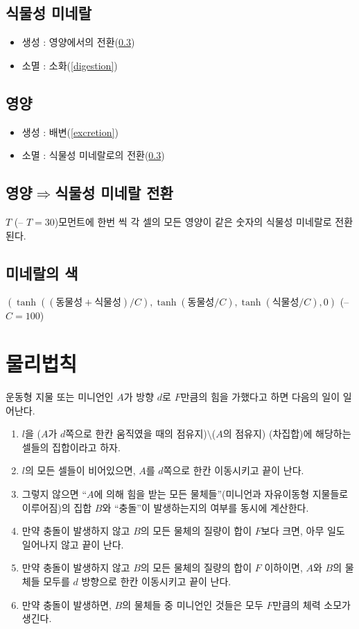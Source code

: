 \documentclass[a4paper,12pt]{article}
\begin{document}
\subsection{식물성 미네랄 }\label{plant mineral detail}
\begin{itemize} 
\item 생성 : 영양에서의 전환(\ref{conversion})
\item 소멸 : 소화(\ref{digestion})
\end{itemize}

\subsection{영양}\label{nutrition detail}
\begin{itemize}
\item 생성 : 배변(\ref{excretion})
\item 소멸 : 식물성 미네랄로의 전환(\ref{conversion})
\end{itemize}  

\subsection{영양$\Rightarrow$식물성 미네랄 전환}\label{conversion}
$T$ (-- $T=30$)모먼트에 한번 씩 각 셀의 모든 영양이 같은 숫자의 식물성 미네랄로 전환된다.

\subsection{미네랄의 색}\label{mineral color}
$(\tanh((\text{동물성}+\text{식물성})/C),\tanh(\text{동물성}/C),\tanh(\text{식물성}/C),0)$ (-- $C=100$)

\section{물리법칙}\label{physics}
운동형 지물 또는 미니언인 $A$가 방향 $d$로 $F$만큼의 힘을 가했다고 하면 다음의 일이 일어난다. 
\begin{enumerate}
\item $l$을 ($A$가 $d$쪽으로 한칸 움직였을 때의 점유지)$\setminus$($A$의 점유지)  (차집합)에 해당하는 셀들의 집합이라고 하자. 
\item $l$의 모든 셀들이 비어있으면, $A$를 $d$쪽으로 한칸 이동시키고 끝이 난다. 
\item 그렇지 않으면 “$A$에 의해 힘을 받는 모든 물체들”(미니언과 자유이동형 지물들로 이루어짐)의 집합 $B$와 “충돌”이 발생하는지의 여부를 동시에 계산한다.
\item 만약 충돌이 발생하지 않고 $B$의 모든 물체의 질량이 합이 $F$보다 크면, 아무 일도 일어나지 않고 끝이 난다. 
\item 만약 충돌이 발생하지 않고 $B$의 모든 물체의 질량의 합이 $F$ 이하이면, $A$와 $B$의 물체들 모두를 $d$ 방향으로 한칸 이동시키고 끝이 난다. 
\item 만약 충돌이 발생하면, $B$의 물체들 중 미니언인 것들은 모두 $F$만큼의 체력 소모가 생긴다. 
\end{enumerate}
\end{document}
